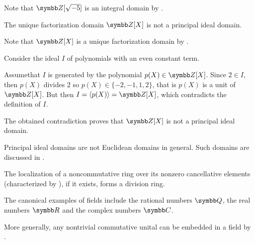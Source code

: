 \begin{example}
\begin{description}
    Note that \( \BZ[\sqrt{-5}] \) is an integral domain by .

    \cite{ProofWiki:polynomials_in_integers_is_not_principal_ideal_domain} The unique factorization domain \( \BZ[X] \) is not a principal ideal domain.

    Note that \( \BZ[X] \) is a unique factorization domain by .

    Consider the ideal \( I \) of polynomials with an even constant term.

    Assume\LEM that \( I \) is generated by the polynomial \( p(X) \in \BZ[X] \). Since \( 2 \in I \), then \( p(X) \) divides \( 2 \) so \( p(X) \in \{ -2, -1, 1, 2 \} \), that is \( p(X) \) is a unit of \( \BZ[X] \). But then \( I = \Gen{p(X)} = \BZ[X] \), which contradicts the definition of \( I \).

    The obtained contradiction proves that \( \BZ[X] \) is not a principal ideal domain.

     Principal ideal domains are not Euclidean domains in general. Such domains are discussed in \cite{Anderson1986}.

     The localization of a noncommutative ring over its nonzero cancellative elements (characterized by ), if it exists, forms a division ring.

     The canonical examples of fields include the rational numbers \( \BQ \), the real numbers \( \BR \) and the complex numbers \( \BC \).

    More generally, any nontrivial commutative unital can be embedded in a field by .
  \end{description}
\end{example}

